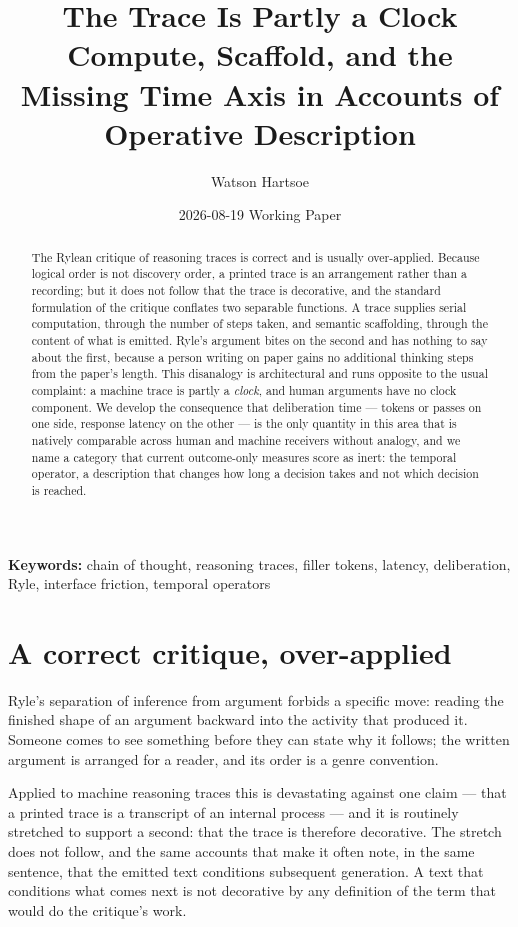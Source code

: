 \documentclass[11pt,a4paper]{article}
\title{\textbf{The Trace Is Partly a Clock}\\[.35em]\large Compute, Scaffold, and the Missing Time Axis in Accounts of Operative Description}
\author{Watson Hartsoe}
\date{2026-08-19 \quad\textemdash\quad Working Paper}
\begin{document}
\maketitle
\begin{abstract}\noindent The Rylean critique of reasoning traces is correct and is usually over-applied. Because logical order is not discovery order, a printed trace is an arrangement rather than a recording; but it does not follow that the trace is decorative, and the standard formulation of the critique conflates two separable functions. A trace supplies serial computation, through the number of steps taken, and semantic scaffolding, through the content of what is emitted. Ryle's argument bites on the second and has nothing to say about the first, because a person writing on paper gains no additional thinking steps from the paper's length. This disanalogy is architectural and runs opposite to the usual complaint: a machine trace is partly a \emph{clock}, and human arguments have no clock component. We develop the consequence that deliberation time --- tokens or passes on one side, response latency on the other --- is the only quantity in this area that is natively comparable across human and machine receivers without analogy, and we name a category that current outcome-only measures score as inert: the temporal operator, a description that changes how long a decision takes and not which decision is reached.\end{abstract}
\vspace{-.5em}\noindent\textbf{Keywords:} chain of thought, reasoning traces, filler tokens, latency, deliberation, Ryle, interface friction, temporal operators\par\vspace{1em}
\section{A correct critique, over-applied}
Ryle's separation of inference from argument forbids a specific move: reading the finished shape of an argument backward into the activity that produced it. Someone comes to see something before they can state why it follows; the written argument is arranged for a reader, and its order is a genre convention.

Applied to machine reasoning traces this is devastating against one claim --- that a printed trace is a transcript of an internal process --- and it is routinely stretched to support a second: that the trace is therefore decorative. The stretch does not follow, and the same accounts that make it often note, in the same sentence, that the emitted text conditions subsequent generation. A text that conditions what comes next is not decorative by any definition of the term that would do the critique's work.
\end{document}
